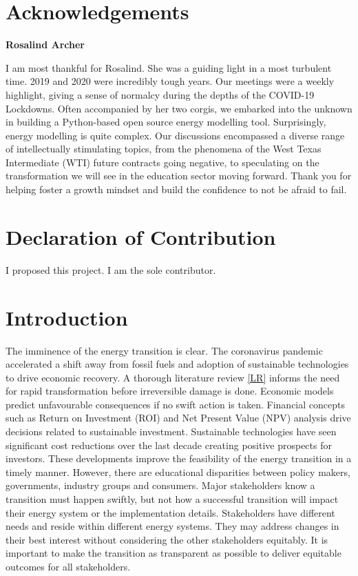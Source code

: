 \documentclass[12pt]{article}
\begin{document}
\section*{Acknowledgements}
\begin{center}
	\textbf{Rosalind Archer}
\end{center}
I am most thankful for Rosalind. She was a guiding light in a most turbulent time.
2019 and 2020 were incredibly tough years.
Our meetings were a weekly highlight, giving a sense of normalcy during the depths of the COVID-19 Lockdowns.
Often accompanied by her two corgis, we embarked into the unknown in building a Python-based open source energy modelling tool.
Surprisingly, energy modelling is quite complex.
Our discussions encompassed a diverse range of intellectually stimulating topics, 
from the phenomena of the West Texas Intermediate (WTI) future contracts going negative,
to speculating on the transformation we will see in the education sector moving forward.
Thank you for helping foster a growth mindset and build the confidence to not be afraid to fail.

\newpage
\section*{Declaration of Contribution}
I proposed this project. I am the sole contributor.

\newpage
\tableofcontents
\newpage
\listoffigures
\listoftables
\newpage
\section{Introduction}
The imminence of the energy transition is clear.
The coronavirus pandemic accelerated a shift away from fossil fuels and adoption of sustainable technologies to drive economic recovery.
A thorough literature review \ref{LR} informs the need for rapid transformation before irreversible damage is done.
Economic models predict unfavourable consequences if no swift action is taken.
Financial concepts such as Return on Investment (ROI) and Net Present Value (NPV) analysis drive decisions related to sustainable investment.
Sustainable technologies have seen significant cost reductions over the last decade creating positive prospects for investors.
These developments improve the feasibility of the energy transition in a timely manner.
However, there are educational disparities between policy makers, governments, industry groups and consumers.
Major stakeholders know a transition must happen swiftly, but not how a successful transition will impact their energy system or the implementation details.
Stakeholders have different needs and reside within different energy systems. 
They may address changes in their best interest without considering the other stakeholders equitably.
It is important to make the transition as transparent as possible to deliver equitable outcomes for all stakeholders.
\end{document}
